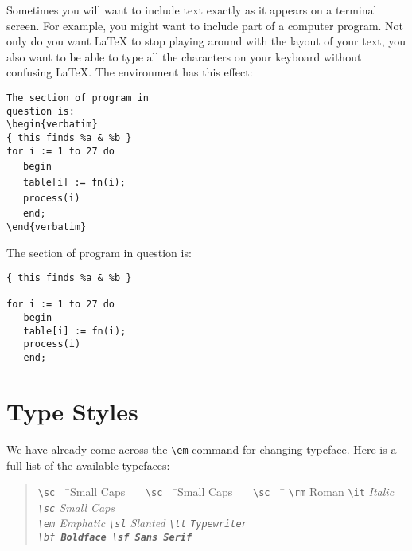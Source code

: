 Sometimes you will want to include text exactly as it appears on a terminal
screen.  For example, you might want to include part of a computer program.
Not only do you want \LaTeX{} to stop playing around with the layout of your
text, you also want to be able to type all the characters on your keyboard
without confusing \LaTeX. The  environment has this effect:
\egstart
\begin{flushleft}
\verb|The section of program in|  \\
\verb|question is:|               \\
\verb|\begin{verbatim}|           \\
\verb|{ this finds %a & %b }|     \\[2ex]

\verb|for i := 1 to 27 do|        \\
\ \ \ \verb|begin|                \\
\ \ \ \verb|table[i] := fn(i);|   \\
\ \ \ \verb|process(i)|           \\
\ \ \ \verb|end;|                 \\
\verb|\end{verbatim}|
\end{flushleft}
\egmid%
The section of program in
question is:
\begin{verbatim}
{ this finds %a & %b }

for i := 1 to 27 do
   begin
   table[i] := fn(i);
   process(i)
   end;

\end{verbatim}
\egend

\section{Type Styles}

We have already come across the \verb|\em| command for changing
typeface.  Here is a full list of the available typefaces:
\begin{quote}\begin{tabbing}
\verb|\sc|~~ \= \sc Small Caps~~~ \= \verb|\sc|~~ \= \sc Small Caps~~~
                                  \= \verb|\sc|~~ \=                   \kill
\verb|\rm|   \> \rm Roman         \> \verb|\it|   \> \it Italic
                                  \> \verb|\sc|   \> \sc Small Caps    \\
\verb|\em|   \> \em Emphatic      \> \verb|\sl| \> \sl Slanted
                                  \> \verb|\tt|   \> \tt Typewriter     \\
\verb|\bf|   \> \bf Boldface      \> \verb|\sf| \> \sf Sans Serif
\end{tabbing}\end{quote}

